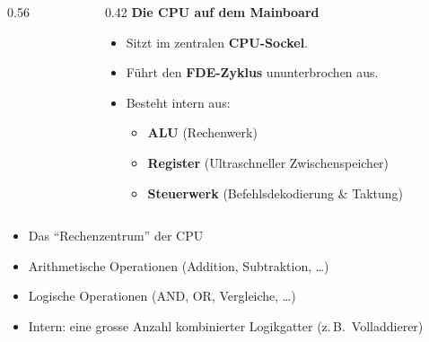 \begin{frame}
\begin{columns}[c,onlytextwidth]
    \begin{column}{0.56\textwidth}
        \centering
    \end{column}
    \begin{column}{0.42\textwidth}
        \large\bfseries\color{ForestGreen!90!black}Die CPU auf dem Mainboard\par\vspace{3mm}
        \normalsize\normalfont
        \begin{itemize}\setlength\itemsep{6pt}
            \item Sitzt im zentralen \textbf{CPU-Sockel}.
            \item Führt den \textbf{FDE-Zyklus} ununterbrochen aus.
            \item Besteht intern aus:
            \begin{itemize}\setlength\itemsep{3pt}
                \item \textbf{ALU} (Rechenwerk)
                \item \textbf{Register} (Ultraschneller Zwischenspeicher)
                \item \textbf{Steuerwerk} (Befehlsdekodierung \& Taktung)
            \end{itemize}
        \end{itemize}
    \end{column}
\end{columns}
\end{frame}

\begin{frame}
\begin{itemize}[<+->]\setlength\itemsep{7pt}
  \item Das \enquote{Rechenzentrum} der CPU
  \item Arithmetische Operationen (Addition, Subtraktion, \ldots)
  \item Logische Operationen (AND, OR, Vergleiche, \ldots)
  \item Intern: eine grosse Anzahl kombinierter Logikgatter (z.\,B.\ Volladdierer)
\end{itemize}
\end{frame}

